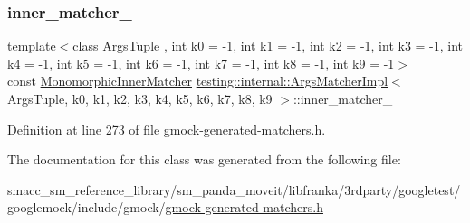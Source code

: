 \subsubsection{\texorpdfstring{inner\+\_\+matcher\+\_\+}{inner\_matcher\_}}
{\footnotesize\ttfamily template$<$class Args\+Tuple , int k0 = -\/1, int k1 = -\/1, int k2 = -\/1, int k3 = -\/1, int k4 = -\/1, int k5 = -\/1, int k6 = -\/1, int k7 = -\/1, int k8 = -\/1, int k9 = -\/1$>$ \\
const \hyperlink{classtesting_1_1internal_1_1ArgsMatcherImpl_ab90d2c074b2072d6c39bf26209fb941f}{Monomorphic\+Inner\+Matcher} \hyperlink{classtesting_1_1internal_1_1ArgsMatcherImpl}{testing\+::internal\+::\+Args\+Matcher\+Impl}$<$ Args\+Tuple, k0, k1, k2, k3, k4, k5, k6, k7, k8, k9 $>$\+::inner\+\_\+matcher\+\_\+\hspace{0.3cm}{\ttfamily [private]}}



Definition at line 273 of file gmock-\/generated-\/matchers.\+h.



The documentation for this class was generated from the following file\+:\begin{DoxyCompactItemize}
\item 
smacc\+\_\+sm\+\_\+reference\+\_\+library/sm\+\_\+panda\+\_\+moveit/libfranka/3rdparty/googletest/googlemock/include/gmock/\hyperlink{gmock-generated-matchers_8h}{gmock-\/generated-\/matchers.\+h}\end{DoxyCompactItemize}
